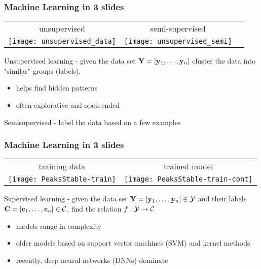 \documentclass[12pt,fleqn]{beamer}
\begin{document}
\begin{frame}\frametitle{{Machine Learning in 3 slides}}
	
\begin{center}
	\begin{tabular}{ccc}
		unsupervised & semi-supervised \\
		\texttt{[image: unsupervised\_data]}&
		\texttt{[image: unsupervised\_semi]}		
	\end{tabular}
\end{center}

Unsupervised learning - given the data set ${\bf Y} = [{\bf y}_1,\ldots,{\bf y}_n]$
cluster the data into "similar" groups (labels).
 
\bigskip

\begin{itemize}
\item helps find hidden patterns
\item often explorative and open-ended
\end{itemize}

\bigskip

Semisupervised - label the data based on a few examples


\end{frame}

\begin{frame}\frametitle{{Machine Learning in 3 slides}}
	
	\begin{center}
		\begin{tabular}{cc}
			training data & trained model\\
			\texttt{[image: PeaksStable-train]}
			&
			\texttt{[image: PeaksStable-train-cont]}
			
		\end{tabular}
	\end{center}
	

Supervised learning - given the data set ${\bf Y} = [{\bf y}_1,\ldots,{\bf y}_n] \in {\cal Y}$
and their labels ${\bf C} = [{\bf c}_1,\ldots,{\bf c}_n] \in {\cal C}$, find the relation $f:{\cal Y}\rightarrow {\cal C}$
 
\bigskip

\begin{itemize}
\item models range in complexity
\item older models based on support vector machines (SVM) and kernel methods
\item recently, deep neural networks (DNNs) dominate
\end{itemize}


\end{frame}
\end{document}
